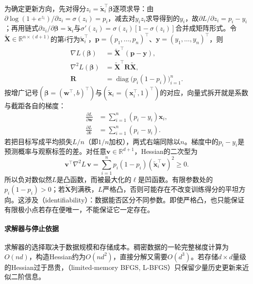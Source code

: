 为确定更新方向，先对得分$z_i=\tilde{\bm{x}}_i^{\top}\bm{\beta}$逐项求导：由$\partial\log(1+e^{z_i})/\partial z_i=\sigma(z_i)=p_i$，减去对$y_i z_i$求导得到的$y_i$，故$\partial L/\partial z_i=p_i-y_i$；再用链式$\partial z_i/\partial\bm{\beta}=\tilde{\bm{x}}_i$与$\sigma'(z_i)=\sigma(z_i)[1-\sigma(z_i)]$合并成矩阵形式。令$\tilde{\bm{X}}\in\mathbb{R}^{n\times(d+1)}$的第$i$行为$\tilde{\bm{x}}_i^{\top}$，$\bm{p}=(p_1,\ldots,p_n)^{\top}$、$\bm{y}=(y_1,\ldots,y_n)^{\top}$，则
\begin{equation}
  \label{eq:classification-logistic-derivatives}
  \begin{aligned}
    \nabla L(\bm{\beta})
      &=\tilde{\bm{X}}^{\top}(\bm{p}-\bm{y}),\\
    \nabla^2 L(\bm{\beta})
      &=\tilde{\bm{X}}^{\top}\bm{R}\tilde{\bm{X}},\\
    \bm{R}
      &=\operatorname{diag}\bigl(p_i(1-p_i)\bigr)_{i=1}^{n}.
  \end{aligned}
\end{equation}
按增广记号$(\bm{\beta}=(\bm{w}^{\top},b)^{\top})$与$(\tilde{\bm{x}}_i=(\bm{x}_i^{\top},1)^{\top})$的对应，向量式拆开就是系数与截距各自的梯度：
\begin{equation}
  \label{eq:classification-logistic-wb-gradient}
  \begin{aligned}
    \frac{\partial L}{\partial\bm{w}}
      &=\sum_{i=1}^{n}(p_i-y_i)\bm{x}_i,\\
    \frac{\partial L}{\partial b}
      &=\sum_{i=1}^{n}(p_i-y_i).
  \end{aligned}
\end{equation}
若把目标写成平均损失$L/n$（即$1/n$加权），两式右端同除以$n$。梯度中的$p_i-y_i$是预测概率与观察标签的差。对任意$\bm{v}\in\mathbb{R}^{d+1}$，Hessian的二次型为
\[
  \bm{v}^{\top}\nabla^2L\,\bm{v}
  =\sum_{i=1}^{n}p_i(1-p_i)
    (\tilde{\bm{x}}_i^{\top}\bm{v})^2\geq0.
\]
所以负对数似然$L$是凸函数，而被最大化的$\ell$是凹函数。有限参数处的$p_i(1-p_i)>0$；若$\tilde{\bm{X}}$列满秩，$L$严格凸，否则可能存在不改变训练得分的平坦方向。这涉及（identifiability）：数据能否区分不同参数。即使严格凸，也只能保证有限极小点若存在便唯一，不能保证它一定存在。

\paragraph{求解器与停止依据}
求解器的选择取决于数据规模和存储成本。稠密数据的一轮完整梯度计算为$O(nd)$，构造Hessian约为$O(nd^2)$，直接分解又需要$O(d^3)$。若存储$d\times d$量级的Hessian过于昂贵，（limited-memory BFGS, L-BFGS）只保留少量历史更新来近似二阶信息。

